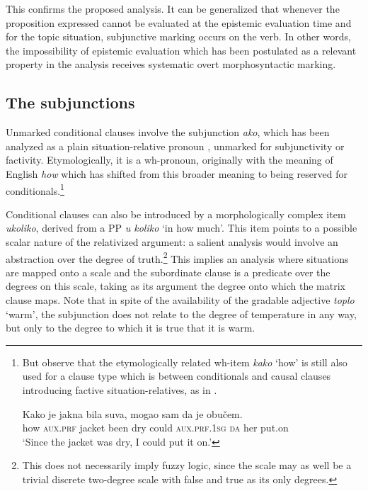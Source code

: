 \documentclass[output=paper,
colorlinks,
citecolor=brown,
newtxmath
]{langscibook}
\begin{document}
\noindent This confirms the proposed analysis. It can be generalized that whenever the proposition expressed cannot be evaluated at the epistemic evaluation time and for the topic situation, subjunctive marking occurs on the verb. In other words, the impossibility of epistemic evaluation which has been postulated as a relevant property in the analysis receives systematic overt morphosyntactic marking.

\largerpage[2] %

\subsection{The subjunctions}\label{subsec:Subjunctions}

Unmarked conditional clauses involve the subjunction \textit{ako}, which has been ana\-lyzed as a plain situation-relative pronoun \citep{Arsenijevic2009b}, unmarked for subjunctivity or factivity. Etymologically, it is a wh-pronoun, originally with the meaning of English \textit{how} which has shifted from this broader meaning to being reserved for conditionals.\footnote{But observe that the etymologically related wh-item \textit{kako} `how' is still also used for a clause type which is between conditionals and causal clauses introducing factive situation-relatives, as in .

\ea\label{ex:Kako}
	\gll Kako  je  jakna  bila  suva,  mogao sam  da  je  obučem.\\
how  \textsc{aux.prf}  jacket been  dry  could  \textsc{aux.prf.1sg} \textsc{da}  her  put.on\\
\glt `Since the jacket was dry, I could put it on.'
\z}

Conditional clauses can also be introduced by a morphologically complex item \textit{ukoliko}, derived from a PP \textit{u koliko} `in how much'. This item points to a possible scalar nature of the relativized argument: a salient analysis would involve an abstraction over the degree of truth.\footnote{This does not necessarily imply fuzzy logic, since the scale may as well be a trivial discrete two-degree scale with false and true as its only degrees.} This implies an analysis where situations are mapped onto a scale and the subordinate clause is a predicate over the degrees on this scale, taking as its argument the degree onto which the matrix clause maps. Note that in spite of the availability of the gradable adjective \textit{toplo} `warm', the subjunction does not relate to the degree of temperature in any way, but only to the degree to which it is true that it is warm.
\end{document}
